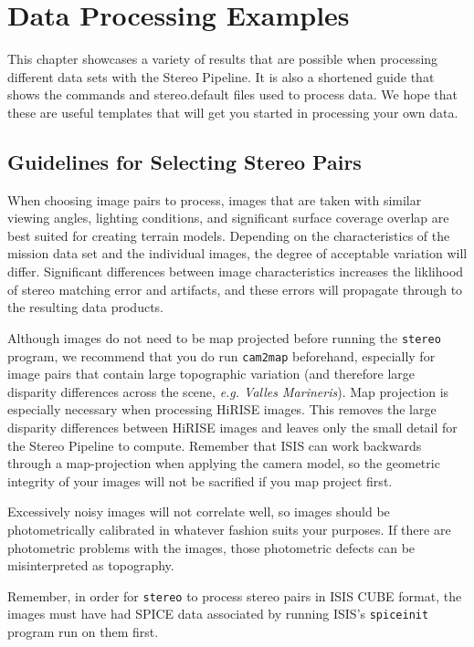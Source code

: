 \chapter{Data Processing Examples}
\label{ch:examples}

This chapter showcases a variety of results that are possible when
processing different data sets with the Stereo Pipeline. It is also a
shortened guide that shows the commands and stereo.default files used
to process data. We hope that these are useful templates that will get
you started in processing your own data.

\section{Guidelines for Selecting Stereo Pairs}

When choosing image pairs to process, images that are taken with
similar viewing angles, lighting conditions, and significant surface
coverage overlap are best suited for creating terrain
models. Depending on the characteristics of the mission data set and
the individual images, the degree of acceptable variation will
differ. Significant differences between image characteristics
increases the liklihood of stereo matching error and artifacts, and
these errors will propagate through to the resulting data products.

Although images do not need to be map projected before running the
\texttt{stereo} program, we recommend that you do run {\tt cam2map}
beforehand, especially for image pairs that contain large topographic
variation (and therefore large disparity differences across the scene,
\emph{e.g. Valles Marineris}).  Map projection is especially necessary
when processing HiRISE images. This removes the large disparity
differences between HiRISE images and leaves only the small detail for
the Stereo Pipeline to compute. Remember that ISIS can work backwards
through a map-projection when applying the camera model, so the
geometric integrity of your images will not be sacrified if you map
project first.

Excessively noisy images will not correlate well, so images should be
photometrically calibrated in whatever fashion suits your purposes. If
there are photometric problems with the images, those photometric
defects can be misinterpreted as topography.

Remember, in order for \texttt{stereo} to process stereo pairs in ISIS
CUBE format, the images must have had SPICE data associated by running
ISIS's \texttt{spiceinit} program run on them first.

